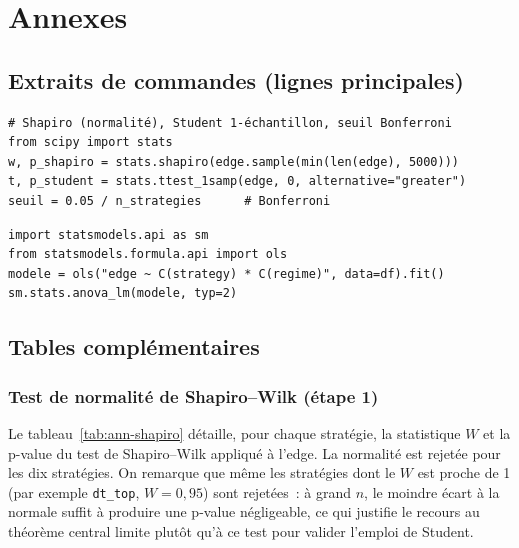 \chapter{Annexes}
\label{chap:annexes}

\section{Extraits de commandes (lignes principales)}
\label{ann:code}

\begin{lstlisting}[caption={Test de l'avantage moyen (extrait).}]
# Shapiro (normalité), Student 1-échantillon, seuil Bonferroni
from scipy import stats
w, p_shapiro = stats.shapiro(edge.sample(min(len(edge), 5000)))
t, p_student = stats.ttest_1samp(edge, 0, alternative="greater")
seuil = 0.05 / n_strategies      # Bonferroni
\end{lstlisting}

\begin{lstlisting}[caption={ANOVA à deux facteurs avec interaction (extrait).}]
import statsmodels.api as sm
from statsmodels.formula.api import ols
modele = ols("edge ~ C(strategy) * C(regime)", data=df).fit()
sm.stats.anova_lm(modele, typ=2)
\end{lstlisting}

\section{Tables complémentaires}
\label{ann:tables}

\subsection*{Test de normalité de Shapiro--Wilk (étape 1)}

Le tableau~\ref{tab:ann-shapiro} détaille, pour chaque stratégie, la
statistique \(W\) et la p-value du test de Shapiro--Wilk appliqué à
l'edge. La normalité est rejetée pour les dix stratégies. On remarque que
même les stratégies dont le \(W\) est proche de 1 (par exemple
\texttt{dt\_top}, \(W = 0{,}95\)) sont rejetées~: à grand \(n\), le
moindre écart à la normale suffit à produire une p-value négligeable, ce
qui justifie le recours au théorème central limite plutôt qu'à ce test
pour valider l'emploi de Student.

